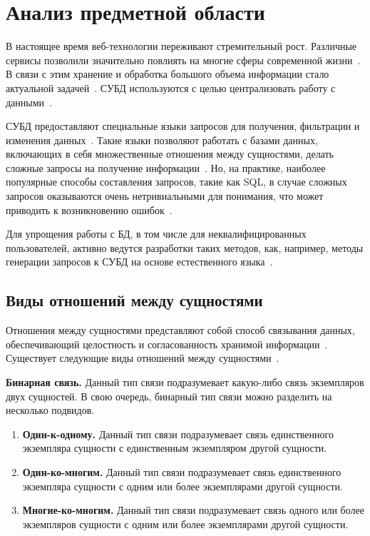\chapter{Анализ предметной области}

В настоящее время веб-технологии переживают стремительный рост. Различные сервисы позволили значительно повлиять на многие сферы современной жизни~\cite{murodilov2023web}. В связи с этим хранение и обработка большого объема информации стало актуальной задачей~\cite{картавец2019актуальность}. СУБД используются с целью централизовать работу с данными~\cite{стасышин2022проектирование}.

СУБД предоставляют специальные языки запросов для получения, фильтрации и изменения данных~\cite{song2023testing}. Такие языки позволяют работать с базами данных, включающих в себя множественные отношения между сущностями, делать сложные запросы на получение информации~\cite{hohenstein1992sql}. Но, на практике, наиболее популярные способы составления запросов, такие как SQL, в случае сложных запросов оказываются очень нетривиальными для понимания, что может приводить к возникновению ошибок~\cite{date2011sql}.

Для упрощения работы с БД, в том числе для неквалифицированных пользователей, активно ведутся разработки таких методов, как, например,  методы генерации запросов к СУБД на основе естественного языка~\cite{fu2023catsql}\cite{naik2023sql}\cite{sun2023sql}.


\section{Виды отношений между сущностями}

Отношения между сущностями представляют собой способ связывания данных, обеспечивающий целостность и согласованность хранимой информации~\cite{чаглей2023сравнение}. Существует следующие виды отношений между сущностями~\cite{стасышин2022проектирование}.

\textbf{Бинарная связь.} Данный тип связи подразумевает какую-либо связь экземпляров двух сущностей. В свою очередь, бинарный тип связи можно разделить на несколько подвидов.


\begin{enumerate}
	\item \textbf{Один-к-одному.} Данный тип связи подразумевает связь единственного экземпляра сущности с единственным экземпляром другой сущности.
	\item \textbf{Один-ко-многим.} Данный тип связи подразумевает связь единственного экземпляра сущности с одним или более экземплярами другой сущности.
	\item \textbf{Многие-ко-многим.} Данный тип связи подразумевает связь одного или более экземпляров сущности с одним или более экземплярами другой сущности.
\end{enumerate}

